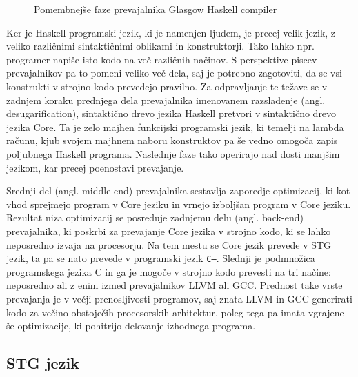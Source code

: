 \begin{figure}[h]
	\caption{Pomembnejše faze prevajalnika Glasgow Haskell compiler}
	\label{fig:shema-ghc}
\end{figure}

Ker je Haskell programski jezik, ki je namenjen ljudem, je precej velik jezik, z veliko različnimi sintaktičnimi oblikami in konstruktorji. Tako lahko npr. programer napiše isto kodo na več različnih načinov. S perspektive piscev prevajalnikov pa to pomeni veliko več dela, saj je potrebno zagotoviti, da se vsi konstrukti v strojno kodo prevedejo pravilno. Za odpravljanje te težave se v zadnjem koraku prednjega dela prevajalnika imenovanem razsladenje (angl. desugarification), sintaktično drevo jezika Haskell pretvori v sintaktično drevo jezika Core. Ta je zelo majhen funkcijski programski jezik, ki temelji na lambda računu, kjub svojem majhnem naboru konstruktov pa še vedno omogoča zapis poljubnega Haskell programa. Naslednje faze tako operirajo nad dosti manjšim jezikom, kar precej poenostavi prevajanje.

Srednji del (angl. middle-end) prevajalnika sestavlja zaporedje optimizacij, ki kot vhod sprejmejo program v Core jeziku in vrnejo izboljšan program v Core jeziku. Rezultat niza optimizacij se posreduje zadnjemu delu (angl. back-end) prevajalnika, ki poskrbi za prevajanje Core jezika v strojno kodo, ki se lahko neposredno izvaja na procesorju. Na tem mestu se Core jezik prevede v STG jezik, ta pa se nato prevede v programski jezik \texttt{C--}. Slednji je podmnožica programskega jezika C in ga je mogoče v strojno kodo prevesti na tri načine: neposredno ali z enim izmed prevajalnikov LLVM ali GCC. Prednost take vrste prevajanja je v večji prenosljivosti programov, saj znata LLVM in GCC generirati kodo za večino obstoječih procesorskih arhitektur, poleg tega pa imata vgrajene še optimizacije, ki pohitrijo delovanje izhodnega programa.

\subsection{STG jezik}
\label{sec:stg-jezik}

